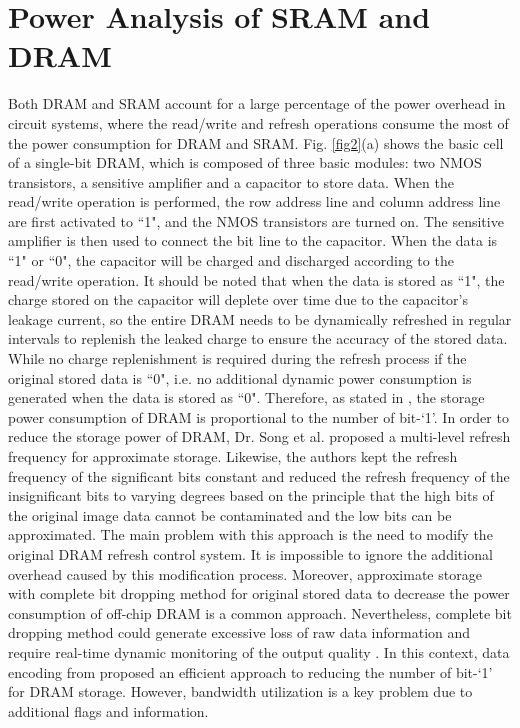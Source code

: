\documentclass[lettersize,journal]{IEEEtran}
\begin{document}
\section{Power Analysis of SRAM and DRAM} \label{sec2}
Both DRAM and SRAM account for a large percentage of the power overhead in circuit systems, where the read/write and refresh operations consume the most of the power consumption for DRAM and SRAM. Fig. \ref{fig2}(a) \cite{5741318} shows the basic cell of a single-bit DRAM, which is composed of three basic modules: two NMOS transistors, a sensitive amplifier and a capacitor to store data. When the read/write operation is performed, the row address line and column address line are first activated to ``1", and the NMOS transistors are turned on. The sensitive amplifier is then used to connect the bit line to the capacitor. When the data is ``1" or ``0", the capacitor will be charged and discharged according to the read/write operation. It should be noted that when the data is stored as ``1", the charge stored on the capacitor will deplete over time due to the capacitor’s leakage current, so the entire DRAM needs to be dynamically refreshed in regular intervals to replenish the leaked charge to ensure the accuracy of the stored data. While no charge replenishment is required during the refresh process if the original stored data is ``0", i.e. no additional dynamic power consumption is generated when the data is stored as ``0". Therefore, as stated in \cite{10.1145/513918.514138,5741318}, the storage power consumption of DRAM is proportional to the number of bit-`1'. In order to reduce the storage power of DRAM, Dr. Song et al. \cite{10.1145/1961296.1950391} proposed a multi-level refresh frequency for approximate storage. Likewise, the authors kept the refresh frequency of the significant bits constant and reduced the refresh frequency of the insignificant bits to varying degrees based on the principle that the high bits of the original image data cannot be contaminated and the low bits can be approximated. The main problem with this approach is the need to modify the original DRAM refresh control system. It is impossible to ignore the additional overhead caused by this modification process. Moreover, approximate storage with complete bit dropping method for original stored data to decrease the power consumption of off-chip DRAM is a common approach. Nevertheless, complete bit dropping method could generate excessive loss of raw data information and require real-time dynamic monitoring of the output quality \cite{miao2014modeling}. In this context, data encoding from \cite{10.1145/605459.605464} proposed an efficient approach to reducing the number of bit-`1' for DRAM storage. However, bandwidth utilization is a key problem due to additional flags and information.
\end{document}

